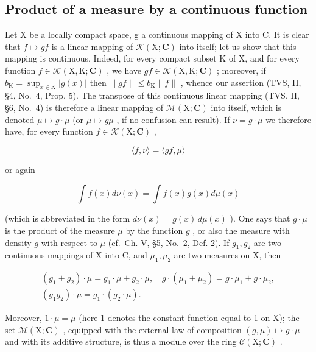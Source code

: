 \subsection{Product of a measure by a continuous function}

Let X be a locally compact space, g a continuous mapping of X into C. It is clear that \(f \mapsto gf\) is a linear mapping of \(\mathcal{K}(\mathrm{X};\mathbf{C})\) into itself; let us show that this mapping is continuous. Indeed, for every compact subset K of X, and for every function \(f \in \mathcal{K}(\mathrm{X},\mathrm{K};\mathbf{C})\) , we have \(gf \in \mathcal{K}(\mathrm{X},\mathrm{K};\mathbf{C})\) ; moreover, if \(b_{\mathrm{K}} = \sup_{x \in \mathrm{K}} |g(x)|\) then \(\|gf\| \leqslant b_{\mathrm{K}} \|f\|\) , whence our assertion (TVS, II, §4, No.~4, Prop. 5). The transpose of this continuous linear mapping (TVS, II, §6, No.~4) is therefore a linear mapping of \(\mathcal{M}(\mathrm{X};\mathbf{C})\) into itself, which is denoted \(\mu \mapsto g \cdot \mu\) (or \(\mu \mapsto g\mu\) , if no confusion can result). If \(\nu = g \cdot \mu\) we therefore have, for every function \(f \in \mathcal{K}(\mathrm{X};\mathbf{C})\) ,

\[
\langle f, \nu \rangle = \langle g f, \mu \rangle\tag{6}
\]

or again

\[
\int f (x) d \nu (x) = \int f (x) g (x) d \mu (x)
\]

(which is abbreviated in the form \(d\nu(x) = g(x) \, d\mu(x)\) ). One says that \(g \cdot \mu\) is the product of the measure \(\mu\) by the function \(g\) , or also the measure with density \(g\) with respect to \(\mu\) (cf.~Ch. V, §5, No.~2, Def. 2). If \(g_1, g_2\) are two continuous mappings of X into C, and \(\mu_1, \mu_2\) are two measures on X, then

\[
\begin{array}{c} (g _ {1} + g _ {2}) \cdot \mu = g _ {1} \cdot \mu + g _ {2} \cdot \mu , \quad g \cdot (\mu_ {1} + \mu_ {2}) = g \cdot \mu_ {1} + g \cdot \mu_ {2}, \\ (g _ {1} g _ {2}) \cdot \mu = g _ {1} \cdot (g _ {2} \cdot \mu). \end{array}
\]

Moreover, \(1 \cdot \mu = \mu\) (here 1 denotes the constant function equal to 1 on X); the set \(\mathcal{M}(\mathrm{X};\mathbf{C})\) , equipped with the external law of composition \((g,\mu) \mapsto g \cdot \mu\) and with its additive structure, is thus a module over the ring \(\mathcal{C}(\mathrm{X};\mathbf{C})\) .

